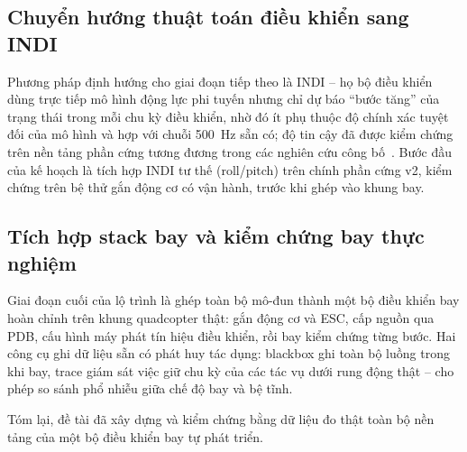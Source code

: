 \subsection*{Chuyển hướng thuật toán điều khiển sang INDI}

Phương pháp định hướng cho giai đoạn tiếp theo là INDI -- họ bộ điều khiển dùng trực tiếp mô hình động lực phi tuyến nhưng chỉ dự báo ``bước tăng'' của trạng thái trong mỗi chu kỳ điều khiển, nhờ đó ít phụ thuộc độ chính xác tuyệt đối của mô hình và hợp với chuỗi 500~Hz sẵn có; độ tin cậy đã được kiểm chứng trên nền tảng phần cứng tương đương trong các nghiên cứu công bố~\cite{smeur}. Bước đầu của kế hoạch là tích hợp INDI tư thế (roll/pitch) trên chính phần cứng v2, kiểm chứng trên bệ thử gắn động cơ có vận hành, trước khi ghép vào khung bay.

\subsection*{Tích hợp stack bay và kiểm chứng bay thực nghiệm}

Giai đoạn cuối của lộ trình là ghép toàn bộ mô-đun thành một bộ điều khiển bay hoàn chỉnh trên khung quadcopter thật: gắn động cơ và ESC, cấp nguồn qua PDB, cấu hình máy phát tín hiệu điều khiển, rồi bay kiểm chứng từng bước. Hai công cụ ghi dữ liệu sẵn có phát huy tác dụng: blackbox ghi toàn bộ luồng trong khi bay, trace giám sát việc giữ chu kỳ của các tác vụ dưới rung động thật -- cho phép so sánh phổ nhiễu giữa chế độ bay và bệ tĩnh.

Tóm lại, đề tài đã xây dựng và kiểm chứng bằng dữ liệu đo thật toàn bộ nền tảng của một bộ điều khiển bay tự phát triển.
